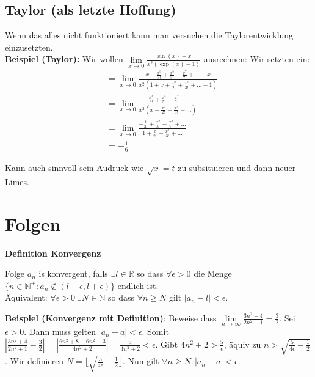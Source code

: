 \documentclass[25pt]{sciposter}
\newcommand{\limm}{\lim\limits_{n \to \infty}}
\newcommand{\N}{\mathbb{N}}
\newenvironment{method}[1]{\begin{mdframed}[backgroundcolor=blue!10,innertopmargin=15pt, innerbottommargin=15pt, nobreak=true]
		\textbf{#1 }
	}
	{ 
	\end{mdframed}
}
\newenvironment{important}{\begin{mdframed}[backgroundcolor=red!50,innertopmargin=15pt, innerbottommargin=15pt, nobreak=true]
		\Large
	}
	{ 
	\end{mdframed}
}
\begin{document}
\begin{multicols}{3}
\subsection*{Taylor (als letzte Hoffung)}
Wenn das alles nicht funktioniert kann man versuchen die Taylorentwicklung einzusetzten. \\
\textbf{Beispiel (Taylor):} Wir wollen $\lim\limits_{x \to 0 } \frac{\sin(x) - x}{x^2(\exp(x)-1)}$ ausrechnen: Wir setzten ein:
\begin{align*}
	&= \lim\limits_{x \to 0 } \frac{x - \frac{x^3}{3!}+ \frac{x^5}{5!} - \frac{x^7}{7!} + \ldots - x}{x^2(1 + x + \frac{x^2}{2!} + \frac{x^3}{3!} + \ldots-1)}\\
	&= \lim\limits_{x \to 0 } \frac{- \frac{x^3}{3!}+ \frac{x^5}{5!} - \frac{x^7}{7!} + \ldots}{x^2(x + \frac{x^2}{2!} + \frac{x^3}{3!} + \ldots)}\\
	&= \lim\limits_{x \to 0 } \frac{- \frac{1}{3!}+ \frac{x^2}{5!} - \frac{x^4}{7!} + \ldots}{1 + \frac{x}{2!} + \frac{x^2}{3!} + \ldots}\\
	&= - \frac{1}{6}
\end{align*}
\begin{important}
Kann auch sinnvoll sein Audruck wie $\sqrt{x} = t$ zu subsituieren und dann neuer Limes.
\end{important}




\section*{Folgen}

\begin{method}{Definition Konvergenz}
Folge $a_n$ is konvergent, falls $\exists l \in \mathbb{R}$ so dass $\forall \epsilon > 0$ die Menge $\{n \in \mathbb{N}^+: a_n \not \in (l-\epsilon, l + \epsilon)\}$ endlich ist. \\
Äquivalent: $\forall \epsilon > 0 \ \exists N \in \N $ so dass $ \forall n \geq N$ gilt $|a_n - l|< \epsilon$.
\end{method}

\textbf{Beispiel (Konvergenz mit Definition)}: 
Beweise dass $\limm \frac{3n^2 + 4}{2n^2 + 1} = \frac{3}{2}$. Sei $\epsilon > 0$. Dann muss gelten $|a_n - a | < \epsilon$. Somit $\left| \frac{3n^2 + 4}{2n^2 + 1} -  \frac{3}{2}\right| = \left| \frac{6n^2 + 8 - 6n^2 -3}{4n^2 + 2} \right| = \frac{5}{4n^2 + 2} < \epsilon$. Gibt $4n^2 + 2 > \frac{5}{\epsilon}$, äquiv zu $n > \sqrt{\frac{5}{4 \epsilon} - \frac{1}{2}}$. Wir definieren $N = \lfloor \sqrt{\frac{5}{4 \epsilon} - \frac{1}{2}} \rfloor$. Nun gilt $\forall n \geq N : |a_n - a | < \epsilon$.





\end{multicols}
\end{document}
